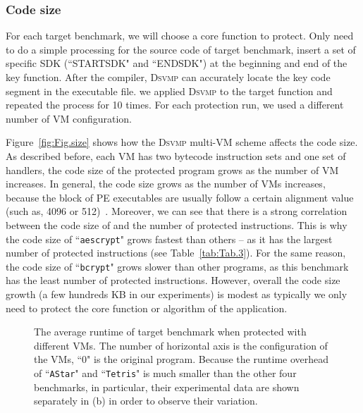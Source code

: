 \documentclass[preprint,12pt,3p]{elsarticle}
\newcommand{\DSVMP}{\textsc{Dsvmp}\xspace}
\begin{document}
\subsubsection{Code size}
For each target benchmark, we will choose a core function to protect. 
Only need to do a simple processing for the source code of target benchmark, 
insert a set of specific SDK (``STARTSDK" and ``ENDSDK") at the beginning and end of the key function. 
After the compiler, \DSVMP can accurately locate the key code segment in the executable file.  
we applied \DSVMP to the target function and repeated the process for 10 times.
For each protection run, we used a different number of VM configuration.

Figure~\ref{fig:Fig.size} shows how the \DSVMP multi-VM scheme affects the code size.
As described before, each VM has two bytecode instruction sets and one set of handlers,
the code size of the protected program grows as the number of VM increases.
In general, the code size grows as the number of VMs increases, because the block of PE executables
are usually follow a certain alignment value (such as, 4096 or 512)~\cite{pe}.
Moreover, we can see that there is a strong correlation between the code size of and the number of protected instructions.
This is why the code size of ``\texttt{aescrypt}" grows fastest than others -- as it has
the largest number of protected instructions (see Table~\ref{tab:Tab.3}).
For the same reason, the code size of ``\texttt{bcrypt}" grows slower than other programs,
as this benchmark has the least number of protected instructions.
However, overall the code size growth (a few hundreds KB in our experiments) is modest as typically we only need
to protect the core function or algorithm of the application.

\begin{figure}[t]
\centering
{}
\caption{The average runtime of target benchmark when protected with different VMs. The number of horizontal axis is the configuration of the VMs, ``0" is the original program. Because the runtime overhead of ``\texttt{AStar}" and ``\texttt{Tetris}" is much smaller than the other four benchmarks, in particular, their experimental data are shown separately in (b) in order to observe their variation.}\label{fig:Fig.time}
\end{figure}
\end{document}
